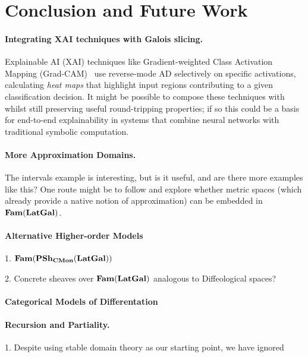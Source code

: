 \section{Conclusion and Future Work}
\label{sec:conclusion}

\paragraph{Integrating XAI techniques with Galois slicing.} 
Explainable AI (XAI) techniques like Gradient-weighted Class Activation Mapping (Grad-CAM)~\cite{selvaraju20}
use reverse-mode AD selectively on specific activations, calculating \emph{heat maps} that highlight input
regions contributing to a given classification decision. It might be possible to compose these techniques with
\GPS whilst still preserving useful round-tripping properties; if so this could be a basis for end-to-end
explainability in systems that combine neural networks with traditional symbolic computation.

\paragraph{More Approximation Domains.} The intervals example is
interesting, but is it useful, and are there more examples like this?
One route might be to follow \cite{edalat-heckmann98} and explore
whether metric spaces (which already provide a native notion of
approximation) can be embedded in $\mathbf{Fam}(\mathbf{LatGal})$.

\paragraph{Alternative Higher-order Models}

1. $\mathbf{Fam}(\mathbf{PSh}_{\mathbf{CMon}}(\mathbf{LatGal}))$

2. Concrete sheaves over $\mathbf{Fam}(\mathbf{LatGal})$ analogous to Diffeological spaces?

\paragraph{Categorical Models of Differentation}



\paragraph{Recursion and Partiality.}
1. Despite using stable domain theory as our starting point, we have ignored

